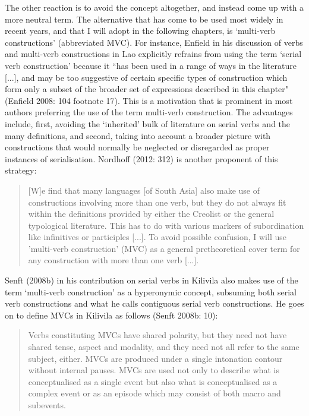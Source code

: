 The other reaction is to avoid the concept altogether, and instead come up with a more neutral term. The alternative that has come to be used most widely in recent years, and that I will adopt in the following chapters, is `multi-verb constructions' (abbreviated MVC). For instance, Enfield in his discussion of verbs and multi-verb constructions in Lao explicitly refrains from using the term `serial verb construction' because it ``has been used in a range of ways in the literature [...], and may be too suggestive of certain specific types of construction which form only a subset of the broader set of expressions described in this chapter" (Enfield 2008: 104 footnote 17). This is a motivation that is prominent in most authors preferring the use of the term multi-verb construction. The advantages include, first, avoiding the `inherited' bulk of literature on serial verbs and the many definitions, and second, taking into account a broader picture with constructions that would normally be neglected or disregarded as proper instances of serialisation. Nordhoff (2012: 312) is another proponent of this strategy:

\begin{quote}
[W]e find that many languages [of South Asia] also make use of constructions involving more than one verb, but they do not always fit within the definitions provided by either the Creolist or the general typological literature. This has to do with various markers of subordination like infinitives or participles [...]. To avoid possible confusion, I will use 'multi-verb construction' (MVC) as a general pretheoretical cover term for any construction with more than one verb [...].
\end{quote}

Senft (2008b) in his contribution on serial verbs in Kilivila also makes use of the term `multi-verb construction' as a hyperonymic concept, subsuming both serial verb constructions and what he calls contiguous serial verb constructions. He goes on to define MVCs in Kilivila as follows (Senft 2008b: 10): 

\begin{quote}Verbs constituting MVCs have shared polarity, but they need not have shared tense, aspect and modality, and they need not all refer to the same subject, either. MVCs are produced under a single intonation contour without internal pauses. MVCs are used not only to describe what is conceptualised as a single event but also what is conceptualised as a complex event or as an episode which may consist of both macro and subevents.\end{quote}

